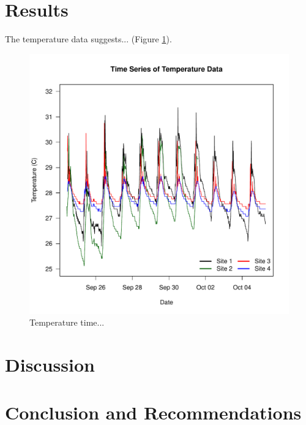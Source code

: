 \documentclass{article}\usepackage[]{graphicx}\usepackage[]{color}
\begin{document}
\section{Results}

The temperature data suggests... (Figure \ref{Temp}).

\begin{figure}
\includegraphics{Figures/Temp}
\caption{Temperature time...}
\label{Temp}
\end{figure}

\section{Discussion}


\section{Conclusion and Recommendations}
\end{document}
